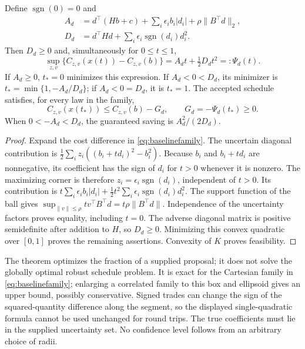 \begin{theorem}\label{thm:baselinestep}
Define $\operatorname{sgn}(0)=0$ and
\begin{align}
 A_d&=d^\top(Hb+c)+\sum_i\epsilon_i b_i|d_i|
                        +\rho\|B^\top d\|_2,\label{eq:stepA}\\
 D_d&=d^\top H d+\sum_i\epsilon_i\operatorname{sgn}(d_i)d_i^2.
 \label{eq:stepD}
\end{align}
Then $D_d\ge0$ and, simultaneously for $0\le t\le1$,
\begin{equation}\label{eq:exactstep}
 \sup_{z,v}\{C_{z,v}(x(t))-C_{z,v}(b)\}
          = A_dt+\tfrac12D_dt^2=:\Psi_d(t).
\end{equation}
If $A_d\ge0$, $t_*=0$ minimizes this expression. If $A_d<0<D_d$,
its minimizer is $t_*=\min\{1,-A_d/D_d\}$; if $A_d<0=D_d$, it is
$t_*=1$. The accepted schedule satisfies, for every law in the family,
\[
 C_{z,v}(x(t_*))\le C_{z,v}(b)-G_d,\qquad
 G_d=-\Psi_d(t_*)\ge0.
\]
When $0<-A_d<D_d$, the guaranteed saving is $A_d^2/(2D_d)$.
\end{theorem}
\begin{proof}
Expand the cost difference in \eqref{eq:baselinefamily}. The uncertain
diagonal contribution is $\tfrac12\sum_i z_i((b_i+td_i)^2-b_i^2)$.
Because $b_i$ and $b_i+td_i$ are nonnegative, its coefficient has the sign
of $d_i$ for $t>0$ whenever it is nonzero. The maximizing corner is therefore
$z_i=\epsilon_i\operatorname{sgn}(d_i)$, independent of $t>0$.
Its contribution is
$t\sum_i\epsilon_i b_i|d_i|+\tfrac12t^2
\sum_i\epsilon_i\operatorname{sgn}(d_i)d_i^2$.
The support function of the ball gives
$\sup_{\|v\|\le\rho}tv^\top B^\top d=t\rho\|B^\top d\|$.
Independence of the uncertainty factors proves equality, including $t=0$.
The adverse diagonal matrix is positive semidefinite after addition to $H$,
so $D_d\ge0$. Minimizing this convex quadratic over $[0,1]$ proves the
remaining assertions. Convexity of $K$ proves feasibility.
\end{proof}

\begin{remark}
The theorem optimizes the fraction of a supplied proposal; it does not solve
the globally optimal robust schedule problem. It is exact for the Cartesian
family in \eqref{eq:baselinefamily}; enlarging a correlated family to this
box and ellipsoid gives an upper bound, possibly conservative. Signed trades
can change the sign of the squared-quantity difference along the segment,
so the displayed single-quadratic formula cannot be used unchanged for
round trips. The true coefficients must lie in the supplied uncertainty set.
No confidence level follows from an arbitrary choice of radii.
\end{remark}

